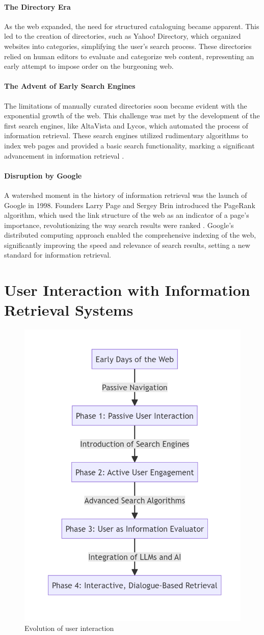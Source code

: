 \documentclass{article}
\begin{document}
\paragraph{The Directory Era} As the web expanded, the need for structured cataloguing became apparent. This led to the creation of directories, such as Yahoo! Directory, which organized websites into categories, simplifying the user's search process. These directories relied on human editors to evaluate and categorize web content, representing an early attempt to impose order on the burgeoning web.

\paragraph{The Advent of Early Search Engines} The limitations of manually curated directories soon became evident with the exponential growth of the web. This challenge was met by the development of the first search engines, like AltaVista and Lycos, which automated the process of information retrieval. These search engines utilized rudimentary algorithms to index web pages and provided a basic search functionality, marking a significant advancement in information retrieval \citep{bar2006methods}.

\paragraph{Disruption by Google} A watershed moment in the history of information retrieval was the launch of Google in 1998. Founders Larry Page and Sergey Brin introduced the PageRank algorithm, which used the link structure of the web as an indicator of a page's importance, revolutionizing the way search results were ranked \citep{brin1998anatomy}. Google's distributed computing approach enabled the comprehensive indexing of the web, significantly improving the speed and relevance of search results, setting a new standard for information retrieval.

\section{User Interaction with Information Retrieval Systems}

\begin{figure}[h]
    \centering
    \includegraphics[width=0.4\linewidth]{ir_2.png}
    \caption{Evolution of user interaction}
    \label{fig:user-interaction}
\end{figure}
\end{document}
